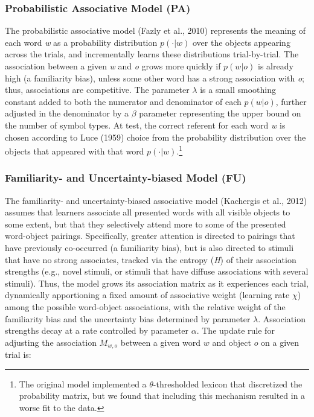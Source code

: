 \documentclass[10pt, letterpaper]{article}
\begin{document}
\hypertarget{probabilistic-associative-model-pa}{%
\subsubsection{Probabilistic Associative Model
(PA)}\label{probabilistic-associative-model-pa}}

The probabilistic associative model (Fazly et al., 2010) represents the
meaning of each word \emph{w} as a probability distribution
\(p(\cdot | w)\) over the objects appearing across the trials, and
incrementally learns these distributions trial-by-trial. The association
between a given \emph{w} and \emph{o} grows more quickly if \(p(w|o)\)
is already high (a familiarity bias), unless some other word has a
strong association with \emph{o}; thus, associations are competitive.
The parameter \(\lambda\) is a small smoothing constant added to both
the numerator and denominator of each \(p(w|o)\), further adjusted in
the denominator by a \(\beta\) parameter representing the upper bound on
the number of symbol types. At test, the correct referent for each word
\emph{w} is chosen according to Luce (1959) choice from the probability
distribution over the objects that appeared with that word
\(p(\cdot | w)\).\footnote{The original model implemented a
  \(\theta\)-thresholded lexicon that discretized the probability
  matrix, but we found that including this mechanism resulted in a worse
  fit to the data.}

\hypertarget{familiarity--and-uncertainty-biased-model-fu}{%
\subsubsection{Familiarity- and Uncertainty-biased Model
(FU)}\label{familiarity--and-uncertainty-biased-model-fu}}

The familiarity- and uncertainty-biased associative model (Kachergis et
al., 2012) assumes that learners associate all presented words with all
visible objects to some extent, but that they selectively attend more to
some of the presented word-object pairings. Specifically, greater
attention is directed to pairings that have previously co-occurred (a
familiarity bias), but is also directed to stimuli that have no strong
associates, tracked via the entropy (\emph{H}) of their association
strengths (e.g., novel stimuli, or stimuli that have diffuse
associations with several stimuli). Thus, the model grows its
association matrix as it experiences each trial, dynamically
apportioning a fixed amount of associative weight (learning rate
\(\chi\)) among the possible word-object associations, with the relative
weight of the familiarity bias and the uncertainty bias determined by
parameter \(\lambda\). Association strengths decay at a rate controlled
by parameter \(\alpha\). The update rule for adjusting the association
\(M_{w,o}\) between a given word \(w\) and object \(o\) on a given trial
is:
\end{document}

